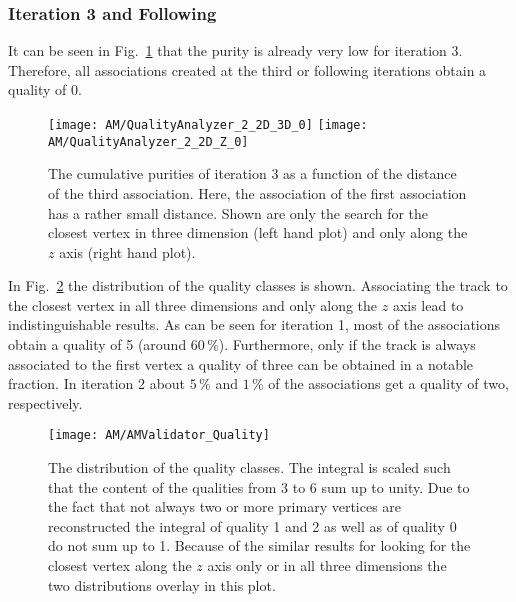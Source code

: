 

\subsubsection{Iteration 3 and Following}

It can be seen in Fig.~\ref{plot:AMWFQualityI30} that the purity is already very low for iteration 3. Therefore, all associations created at the third or following iterations obtain a quality of 0.

\begin{figure}[!ht]
    \centering
    \texttt{[image: AM/QualityAnalyzer\_2\_2D\_3D\_0]}
    \texttt{[image: AM/QualityAnalyzer\_2\_2D\_Z\_0]}
    \caption[Cumulative purities of iteration 3 \vs{} distance between track and primary vertex to define quality for smaller distances of association one]{The cumulative purities of iteration 3 as a function of the distance of the third association. Here, the association of the first association has a rather small distance. Shown are only the search for the closest vertex in three dimension (left hand plot) and only along the $z$ axis (right hand plot).\label{plot:AMWFQualityI30}}
\end{figure}

In Fig.~\ref{plot:AMWFQualityDist} the distribution of the quality classes is shown. Associating the track to the closest vertex in all three dimensions and only along the $z$ axis lead to indistinguishable results. As can be seen for iteration 1, most of the associations obtain a quality of 5 (around $60\,\%$). Furthermore, only if the track is always associated to the first vertex a quality of three can be obtained in a notable fraction. In iteration 2 about $5\,\%$ and $1\,\%$ of the associations get a quality of two, respectively.

\begin{figure}[!ht]
    \centering
    \texttt{[image: AM/AMValidator\_Quality]}
    \caption[Distribution of the quality classes]{The distribution of the quality classes. The integral is scaled such that the content of the qualities from 3 to 6 sum up to unity. Due to the fact that not always two or more primary vertices are reconstructed the integral of quality 1 and 2 as well as of quality 0 do not sum up to 1. Because of the similar results for looking for the closest vertex along the $z$ axis only or in all three dimensions the two distributions overlay in this plot. \label{plot:AMWFQualityDist}}
\end{figure}

